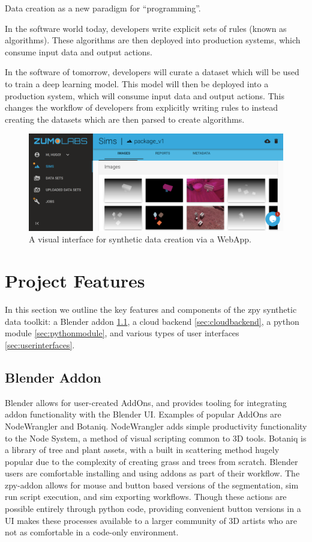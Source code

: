 \documentclass{article}
\begin{document}
Data creation as a new paradigm for “programming”.

In the software world today, developers write explicit sets of rules (known as algorithms). These algorithms are then deployed into production systems, which consume input data and output actions.

In the software of tomorrow, developers will curate a dataset which will be used to train a deep learning model. This model will then be deployed into a production system, which will consume input data and output actions. This changes the workflow of developers from explicitly writing rules to instead creating the datasets which are then parsed to create algorithms.

\begin{figure}
	\centering
	\includegraphics[width=\textwidth]{webapp.png}
	\caption{A visual interface for synthetic data creation via a WebApp.}
	\label{fig:webapp}
\end{figure}

\section{Project Features}
\label{sec:projectfeatures}

In this section we outline the key features and components of the zpy synthetic data toolkit: a Blender addon \ref{sec:blenderaddon}, a cloud backend \ref{sec:cloudbackend}, a python module \ref{sec:pythonmodule}, and various types of user interfaces \ref{sec:userinterfaces}.

\subsection{Blender Addon}
\label{sec:blenderaddon}

Blender allows for user-created AddOns, and provides tooling for integrating addon functionality with the Blender UI. Examples of popular AddOns are NodeWrangler and Botaniq. NodeWrangler adds simple productivity functionality to the Node System, a method of visual scripting common to 3D tools. Botaniq is a library of tree and plant assets, with a built in scattering method hugely popular due to the complexity of creating grass and trees from scratch. Blender users are comfortable installing and using addons as part of their workflow. The zpy-addon allows for mouse and button based versions of the segmentation, sim run script execution, and sim exporting workflows. Though these actions are possible entirely through python code, providing convenient button versions in a UI makes these processes available to a larger community of 3D artists who are not as comfortable in a code-only environment.
\end{document}
